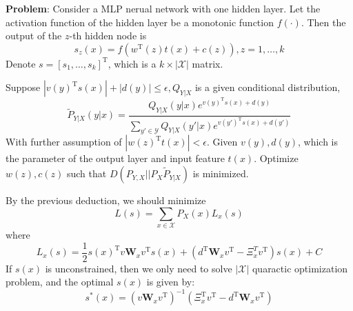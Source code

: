 \documentclass{article}
\def\T{\mathrm{T}}
\begin{document}
\textbf{Problem}: 
Consider a MLP nerual network with one hidden layer. Let the activation function of the hidden layer be a monotonic function $f(\cdot)$. Then the output of the $z$-th hidden node is
\begin{equation}\label{eq:constraint}
s_z(x)=f(w^\T(z)t(x)+c(z)),z=1,\dots,k
\end{equation}
Denote $s=[s_1,\dots,s_k]^\T$, which is a $k \times|\mathcal{X}|$ matrix.

Suppose $|v(y)^\T s(x)|+|d(y)|\leq \epsilon,Q_{Y|X}$ is a given conditional distribution,
$$\tilde{P}_{Y|X}(y|x)=\frac{Q_{Y|X}(y|x) e^{v(y)^\T s(x)+d(y)}}{\sum_{y'\in \mathcal{Y}} Q_{Y|X}(y'|x) e^{v(y')^\T s(x)+d(y')}}$$
With further assumption of $|w(z)^\T t(x)|<\epsilon$. Given $v(y),d(y)$, which is the parameter of the output layer and input feature $t(x)$. Optimize $w(z),c(z)$ such that $D(P_{Y,X}||P_X \tilde{P}_{Y|X})$ is minimized.

By the previous deduction, we should minimize
\begin{equation}\label{eq:min_total}
L(s)=\sum_{x\in \mathcal{X}} P_X(x)L_x(s)
\end{equation}
where
\begin{equation}\label{eq:min_each}
L_x(s)=\frac{1}{2}s(x)^\T v \bm{W}_x v^\T s(x) +(d^\T \bm{W}_x v^\T-\Xi_x^T v^\T) s(x)+C
\end{equation}
If $s(x)$ is unconstrained, then we only need to solve $|\mathcal{X}|$ quaractic optimization problem, and the optimal $s(x)$ is given by:
\begin{equation}
s^*(x)=(v\bm{W}_xv^\T)^{-1}(\Xi_x^\T v^\T -d^\T \bm{W}_x v^\T)
\end{equation}
\end{document}

